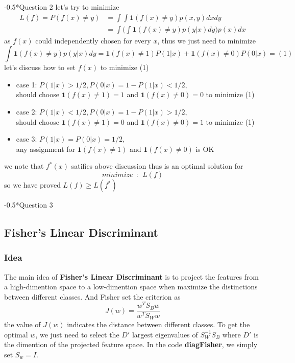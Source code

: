 \documentclass[12pt]{amsart}
\makeatletter
\renewcommand{\section}{\@startsection{section}{1}{0mm}
{-\baselineskip}{0.5\baselineskip}{\bf\leftline}}
\makeatother
\begin{document}
\section*{Question 2}
let's try to minimize
\begin{align*}
	L(f) = P(f(x) \neq y) 
	&= \int\int \mathbf{1}(f(x)\neq y ) p(x, y) dxdy\\
	&= \int \big ( \int \mathbf{1}(f(x)\neq y ) p(y|x) dy \big ) p(x) dx
\end{align*}
as $f(x)$ could independently chosen for every $x$, thus we just need to minimize
$$
	\int \mathbf{1}(f(x)\neq y ) p(y|x) dy 
	=  \mathbf{1}(f(x) \neq 1 ) P(1|x) + \mathbf{1}(f(x) \neq 0 ) P(0|x) = (1)
$$
let's discuss how to set $f(x)$ to minimize (1)
\begin{itemize}
\item case 1: $P(1|x) > 1/2, P(0|x) = 1 - P(1|x) < 1/2$, \\
				should choose $\mathbf{1}(f(x) \neq 1 )  = 1$ and
				$\mathbf{1}(f(x) \neq 0 ) = 0$ to minimize (1)
\item case 2: $P(1|x) < 1/2, P(0|x) = 1 - P(1|x) > 1/2$, \\
				should choose $\mathbf{1}(f(x) \neq 1 )  = 0$ and
				$\mathbf{1}(f(x) \neq 0 ) = 1$ to minimize (1)
\item case 3: $P(1|x) = P(0|x) = 1/2$,\\
				any assignment for $\mathbf{1}(f(x) \neq 1 )$ and $\mathbf{1}(f(x) \neq 0 )$
				is OK
\end{itemize}

we note that $f^*(x)$ satifies above discussion thus is an optimal solution for 
$$
	minimize~~:~~L(f) 
$$
so we have proved $L(f) \geq L(f^*)$


\section*{Question 3}
\subsection*{Fisher's Linear Discriminant}
\subsubsection*{Idea}
The main idea of \textbf{Fisher's Linear Discriminant} is to project the
features from a high-dimention space to a low-dimention space when maximize the 
distinctions between different classes.  And Fisher set the criterion as
$$
	J(w) = \frac{w^TS_Bw}{w^TS_Ww}
$$
the value of $J(w)$ indicates the distance between different classes.
To get the optimal $w$, we just need to select the $D'$ largest eigenvalues of $S_W^{-1}S_B$ where $D'$ is the dimention of the projected feature space.
In the code \textbf{diagFisher}, we simply set $S_w = I$.
\end{document}
